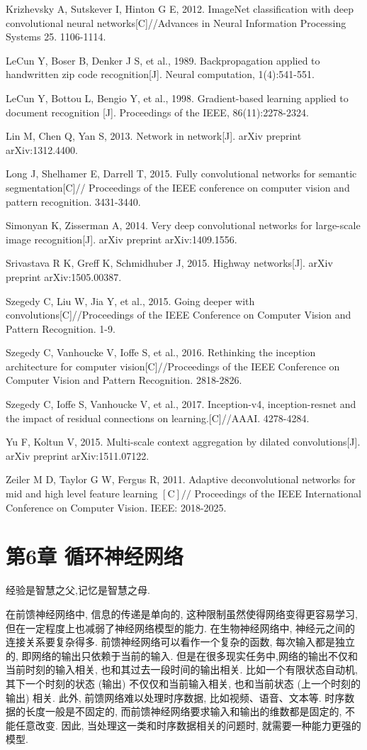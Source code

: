 \documentclass[10pt]{article}
\begin{document}
Krizhevsky A, Sutskever I, Hinton G E, 2012. ImageNet classification with deep convolutional neural networks[C]//Advances in Neural Information Processing Systems 25. 1106-1114.

LeCun Y, Boser B, Denker J S, et al., 1989. Backpropagation applied to handwritten zip code recognition[J]. Neural computation, 1(4):541-551.

LeCun Y, Bottou L, Bengio Y, et al., 1998. Gradient-based learning applied to document recognition [J]. Proceedings of the IEEE, 86(11):2278-2324.

Lin M, Chen Q, Yan S, 2013. Network in network[J]. arXiv preprint arXiv:1312.4400.

Long J, Shelhamer E, Darrell T, 2015. Fully convolutional networks for semantic segmentation[C]// Proceedings of the IEEE conference on computer vision and pattern recognition. 3431-3440.

Simonyan K, Zisserman A, 2014. Very deep convolutional networks for large-scale image recognition[J]. arXiv preprint arXiv:1409.1556.

Srivastava R K, Greff K, Schmidhuber J, 2015. Highway networks[J]. arXiv preprint arXiv:1505.00387.

Szegedy C, Liu W, Jia Y, et al., 2015. Going deeper with convolutions[C]//Proceedings of the IEEE Conference on Computer Vision and Pattern Recognition. 1-9.

Szegedy C, Vanhoucke V, Ioffe S, et al., 2016. Rethinking the inception architecture for computer vision[C]//Proceedings of the IEEE Conference on Computer Vision and Pattern Recognition. 2818-2826.

Szegedy C, Ioffe S, Vanhoucke V, et al., 2017. Inception-v4, inception-resnet and the impact of residual connections on learning.[C]//AAAI. 4278-4284.

Yu F, Koltun V, 2015. Multi-scale context aggregation by dilated convolutions[J]. arXiv preprint arXiv:1511.07122.

Zeiler M D, Taylor G W, Fergus R, 2011. Adaptive deconvolutional networks for mid and high level feature learning $[\mathrm{C}] / /$ Proceedings of the IEEE International Conference on Computer Vision. IEEE: 2018-2025.

\section*{第6章 循环神经网络}
经验是智慧之父,记忆是智慧之母.

在前馈神经网络中, 信息的传递是单向的, 这种限制虽然使得网络变得更容易学习, 但在一定程度上也减弱了神经网络模型的能力. 在生物神经网络中, 神经元之间的连接关系要复杂得多. 前馈神经网络可以看作一个复杂的函数, 每次输入都是独立的, 即网络的输出只依赖于当前的输入. 但是在很多现实任务中,网络的输出不仅和当前时刻的输入相关, 也和其过去一段时间的输出相关. 比如一个有限状态自动机, 其下一个时刻的状态 (输出) 不仅仅和当前输入相关, 也和当前状态 (上一个时刻的输出) 相关. 此外, 前馈网络难以处理时序数据, 比如视频、语音、文本等. 时序数据的长度一般是不固定的, 而前馈神经网络要求输入和输出的维数都是固定的, 不能任意改变. 因此, 当处理这一类和时序数据相关的问题时, 就需要一种能力更强的模型.
\end{document}
